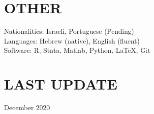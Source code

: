 \documentclass[margin]{res} %
\begin{document}
\begin{resume}
\section{OTHER} 
Nationalities: Israeli, Portuguese (Pending) \\
Languages: Hebrew (native), English (fluent) \\
Software: R, Stata, Matlab, Python, \LaTeX, Git

\section{LAST UPDATE} 
December 2020

\end{resume}
\end{document}
